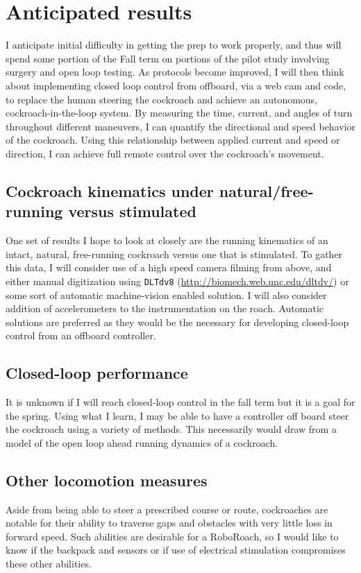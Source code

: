 \section{Anticipated results}
\label{sec:results}

I anticipate initial difficulty in getting the prep to work properly, and thus will spend some portion of the Fall term on portions of the pilot study involving surgery and open loop testing. As protocols become improved, I will then think about implementing closed loop control from offboard, via a web cam and code, to replace the human steering the cockroach and achieve an autonomous, cockroach-in-the-loop system.  By measuring the time, current, and angles of turn throughout different maneuvers, I can quantify the directional and speed behavior of the cockroach. Using this relationship between applied current and speed or direction, I can achieve full remote control over the cockroach's movement. 

\subsection{Cockroach kinematics under natural/free-running versus stimulated}
One set of results I hope to look at closely are the running kinematics of an intact, natural, free-running cockroach versus one that is stimulated. To gather this data, I will consider use of a high speed camera filming from above, and either manual digitization using \lstinline{DLTdv8} (\url{http://biomech.web.unc.edu/dltdv/}) or some sort of automatic machine-vision enabled solution. I will also consider addition of accelerometers to the instrumentation on the roach. Automatic solutions are preferred as they would be the necessary for developing closed-loop control from an offboard controller. 

\subsection{Closed-loop performance}
It is unknown if I will reach closed-loop control in the fall term but it is a goal for the spring. Using what I learn, I may be able to have a controller off board steer the cockroach using a variety of methods. This necessarily would draw from a model of the open loop ahead running dynamics of a cockroach. 

\subsection{Other locomotion measures}
Aside from being able to steer a prescribed course or route, cockroaches are notable for their ability to traverse gaps and obstacles with very little loss in forward speed. Such abilities are desirable for a RoboRoach, so I would like to know if the backpack and sensors or if use of electrical stimulation compromises these other abilities. 


 